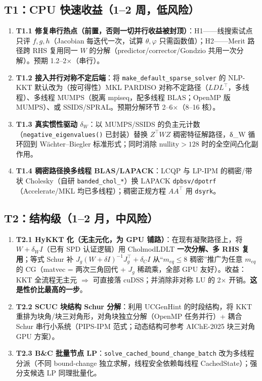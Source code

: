 \documentclass[11pt,a4paper]{ctexart}
\newcommand{\func}[1]{\texttt{#1}}
\begin{document}
\subsection{T1：CPU 快速收益（1--2 周，低风险）}
\begin{enumerate}[leftmargin=2em]
  \item \textbf{T1.1 修复串行热点（前置，否则一切并行收益被封顶）}：H1——线搜索试点只评 $f,g,h$（Jacobian 每迭代一次，试算 $\theta,\varphi$ 只需函数值）；H2——Merit 路径跨 RHS 复用同一 $W$ 的分解（predictor/corrector/Gondzio 共用一次分解）。预期 1.2--2$\times$（串行）。
  \item \textbf{T1.2 接入并行对称不定后端}：将 \func{make\_default\_sparse\_solver} 的 NLP-KKT 默认改为（按可得性）MKL PARDISO 对称不定路径（$LDL^{\top}$，多线程）、多线程 MUMPS（脱离 mpiseq，配多线程 BLAS；OpenMP 版 MUMPS）、或 SSIDS/SPRAL。预期分解环节 2--6$\times$（8--16 核）。
  \item \textbf{T1.3 真实惯性驱动 $\delta_W$}：以 MUMPS/SSIDS 的负主元计数（\func{negative\_eigenvalues()} 已封装）替换 $Z^{\top}WZ$ 稠密特征解路径，δ\_W 循环回到 Wächter--Biegler 标准形式；同时消除 nullity$>128$ 时的全空间凸化副作用。
  \item \textbf{T1.4 稠密路径换多线程 BLAS/LAPACK}：LCQP 与 LP-IPM 的稠密/带状 Cholesky（自研 \func{banded\_chol\_*}）换 LAPACK \func{dpbsv/dpotrf}（Accelerate/MKL 均已多线程）；稠密正规方程 $AA^{\top}$ 用 \func{dsyrk}。
\end{enumerate}

\subsection{T2：结构级（1--2 月，中风险）}
\begin{enumerate}[leftmargin=2em]
  \item \textbf{T2.1 HyKKT 化（无主元化，为 GPU 铺路）}：在现有凝聚路径上，将 $W+\delta_W I$（已有 SPD 认证逻辑）用 CholmodLDLT \textbf{一次分解、多 RHS 复用}；等式 Schur 补 $J_g(W{+}\delta I)^{-1}J_g^{\top}+\delta_C I$ 从``$m_{eq}\le 8$ 稠密''推广为任意 $m_{eq}$ 的 CG（matvec = 两次三角回代 + $J_g$ 稀疏乘，全部 GPU 友好）。收益：KKT 全流程无主元 $\Rightarrow$ 可直接落 cuDSS；并消除非对称 LU 的 2$\times$ 开销。\textbf{这是性价比最高的一步}。
  \item \textbf{T2.2 SCUC 块结构 Schur 分解}：利用 UCGenHint 的时段结构，将 KKT 重排为块角/块三对角形，对角块独立分解（OpenMP 任务并行）+ 耦合 Schur 串行小系统（PIPS-IPM 范式；动态结构可参考 AIChE-2025 块三对角 GPU 方案）。
  \item \textbf{T2.3 B\&C 批量节点 LP}：\func{solve\_cached\_bound\_change\_batch} 改为多线程分派（不同 bound-change 独立求解，线程安全依赖每线程 CachedState）；强分支候选 LP 同理批量化。
\end{enumerate}
\end{document}
